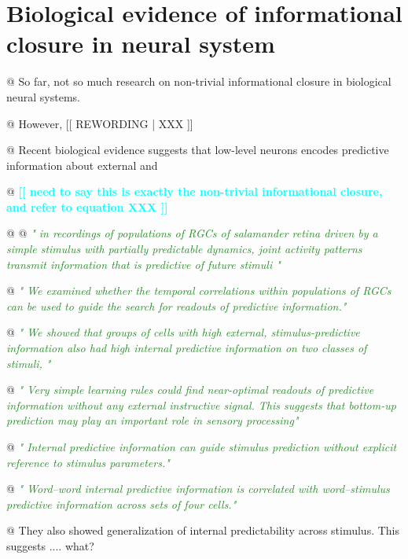 \documentclass[utf8]{article}
\newenvironment{ants}
			{
			 \begin{easylist}[itemize]		
		 	}
			{
			\end{easylist}
			}
\newcommand{\rewrite}[1]{\textcolor{ForestGreen}{\textit{"#1"}}\newline}
\newcommand{\rewording}[1]{\textcolor{RawSienna}{[[ REWORDING | #1 ]]}}
\newcommand{\toWrite}[1]{\noindent
			\textcolor{Cyan}{\textbf{[[ #1 ]]}}}
\begin{document}
	\section*{Biological evidence of informational closure in neural system}
		\begin{ants}		
			
			
			@ So far, not so much research on non-trivial informational closure in biological neural systems. 
			
			@ However, \rewording{XXX}
			
			@ Recent biological evidence suggests that low-level neurons encodes predictive information about external  and 
			
			@ \toWrite{
				need to say this is exactly the non-trivial informational closure, and refer to equation XXX}
			
			@ \cite{sederberg2018learning}
			@ \rewrite{
				in recordings of populations of RGCs of salamander retina driven by a simple stimulus with partially predictable dynamics, joint activity patterns transmit information that is predictive of future stimuli }
			
			@ \rewrite{
				We examined whether the temporal correlations within populations of RGCs can be used to guide the search for readouts of predictive information.}
			
			@ \rewrite{
				We showed that groups of cells with high external, stimulus-predictive information also had high internal predictive information on two classes of stimuli, }
			
			@ \rewrite{
				Very simple learning rules could find near-optimal readouts of predictive information without any external instructive signal. This suggests that bottom-up prediction may play an important role in sensory processing}
			
			@ \rewrite{
				Internal predictive information can guide stimulus prediction without explicit reference to stimulus parameters.}
			
			@ \rewrite{
				Word–word internal predictive information is correlated with word–stimulus predictive information across sets of four cells.}
			
			@ They also showed generalization of internal predictability across stimulus. This suggests .... what?
			

\end{ants}
\end{document}
